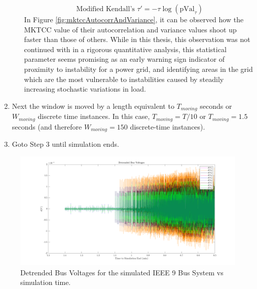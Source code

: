 \begin{enumerate}
\begin{enumerate}
\begin{equation}
				\text{Modified Kendall's } \tau' = -\tau \log{(\text{pVal}_{\tau})}
			\end{equation}
			In Figure \ref{fig:mktccAutocorrAndVariance}, it can be observed how the MKTCC value of their autocorrelation and variance values shoot up faster than those of others. While in this thesis, this observation was not continued with in a rigorous quantitative analysis, this statistical parameter seems promising as an early warning sign indicator of proximity to instability for a power grid, and identifying areas in the grid which are the most vulnerable to instabilities caused by steadily increasing stochastic variations in load.
		\end{enumerate}
	
	\item Next the window is moved by a length equivalent to $T_{moving}$ seconds or $W_{moving}$ discrete time instances. In this case, $T_{moving} = T/10$ or $T_{moving} = 1.5$ seconds (and therefore $W_{moving} = 150$ discrete-time instances).
	
	\item Goto Step 3 until simulation ends.
\end{enumerate}

\begin{figure}[!htpb]
	\centering
	\includegraphics[scale=0.25]{../figures/analysis_matlab/voltsDetrended_run02}
	\caption{Detrended Bus Voltages for the simulated IEEE 9 Bus System vs simulation time.}
	\label{fig:detrendedBusVoltages}
\end{figure}

